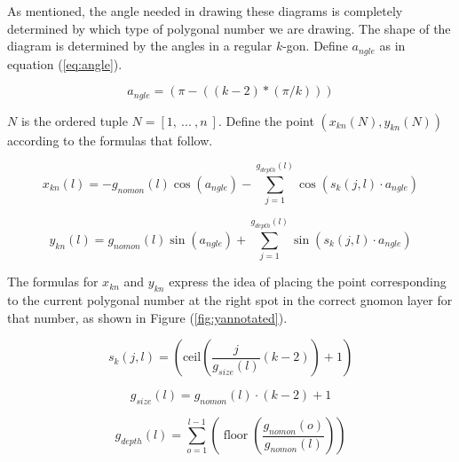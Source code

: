 \documentclass[notitlepage]{report}
\begin{document}
As mentioned, the angle needed in drawing these diagrams is completely determined by which type of polygonal number we are drawing. The shape of the diagram is determined by the angles in a regular $k$-gon. Define $a_{ngle}$ as in equation (\ref{eq:angle}).

\begin{equation}
    a_{ngle}=\left(\pi-((k-2)*(\pi/k))\right)
\label{eq:angle}
\end{equation}


$N$ is the ordered tuple $N=\left[1,\ ...\ ,n\ \right]$. Define the point $\left(x_{kn}\left(N\right),y_{kn}\left(N\right)\right)$ according to the formulas that follow.

\begin{equation}
x_{kn}\left(l\right)=-g_{nomon}\left(l\right)\cos\left(a_{ngle}\right)-\sum_{j=1}^{g_{depth}\left(l\right)}\cos\left(s_{k}\left(j,l\right)\cdot a_{ngle}\right)
\end{equation}

\begin{equation}    y_{kn}\left(l\right)=g_{nomon}\left(l\right)\sin\left(a_{ngle}\right)+\sum_{j=1}^{g_{depth}\left(l\right)}\sin\left(s_{k}\left(j,l\right)\cdot a_{ngle}\right)
\label{eq:yformula}
\end{equation}

The formulas for $x_{kn}$ and $y_{kn}$ express the idea of placing the point corresponding to the current polygonal number at the right spot in the correct gnomon layer for that number, as shown in Figure (\ref{fig:yannotated}).



\begin{equation}
s_{k}\left(j,l\right)=\left(\text{ceil}\left(\frac{j}{g_{size}\left(l\right)}\left(k-2\right)\right)+1\right)
\end{equation}

\begin{equation}
g_{size}\left(l\right)=g_{nomon}\left(l\right)\cdot\left(k-2\right)+1
\end{equation}

\begin{equation}
    g_{depth}\left(l\right)=\sum_{o=1}^{l-1}\left(\operatorname{floor}\left(\frac{g_{nomon}\left(o\right)}{g_{nomon}\left(l\right)}\right)\right)
\end{equation}
\end{document}
